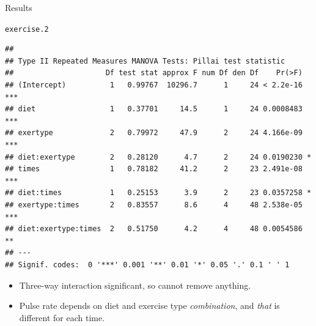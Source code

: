 \documentclass[unknownkeysallowed]{beamer}\usepackage[]{graphicx}\usepackage[]{color}
\makeatletter
\newcommand{\hlstd}[1]{\textcolor[rgb]{0.345,0.345,0.345}{#1}}%
\newenvironment{kframe}{%
 \def\at@end@of@kframe{}%
 \ifinner\ifhmode%
  \def\at@end@of@kframe{\end{minipage}}%
  \begin{minipage}{\columnwidth}%
 \fi\fi%
 \def\FrameCommand##1{\hskip\@totalleftmargin \hskip-\fboxsep
 \colorbox{shadecolor}{##1}\hskip-\fboxsep
     \hskip-\linewidth \hskip-\@totalleftmargin \hskip\columnwidth}%
 \MakeFramed {\advance\hsize-\width
   \@totalleftmargin\z@ \linewidth\hsize
   \@setminipage}}%
 {\par\unskip\endMakeFramed%
 \at@end@of@kframe}
\newenvironment{knitrout}{}{} %
\makeatother
\begin{document}
\begin{frame}[fragile]{Results}
  
  
  \begin{scriptsize}
\begin{knitrout}
\color{fgcolor}\begin{kframe}
\begin{alltt}
\hlstd{exercise.2}
\end{alltt}
\begin{verbatim}
## 
## Type II Repeated Measures MANOVA Tests: Pillai test statistic
##                     Df test stat approx F num Df den Df    Pr(>F)    
## (Intercept)          1   0.99767  10296.7      1     24 < 2.2e-16 ***
## diet                 1   0.37701     14.5      1     24 0.0008483 ***
## exertype             2   0.79972     47.9      2     24 4.166e-09 ***
## diet:exertype        2   0.28120      4.7      2     24 0.0190230 *  
## times                1   0.78182     41.2      2     23 2.491e-08 ***
## diet:times           1   0.25153      3.9      2     23 0.0357258 *  
## exertype:times       2   0.83557      8.6      4     48 2.538e-05 ***
## diet:exertype:times  2   0.51750      4.2      4     48 0.0054586 ** 
## ---
## Signif. codes:  0 '***' 0.001 '**' 0.01 '*' 0.05 '.' 0.1 ' ' 1
\end{verbatim}
\end{kframe}
\end{knitrout}
  \end{scriptsize}

\begin{itemize}
\item Three-way interaction significant, so cannot remove anything.
\item Pulse rate depends on diet and exercise type \emph{combination},
  and \emph{that} is different for each time.
\end{itemize}
  
\end{frame}
\end{document}
